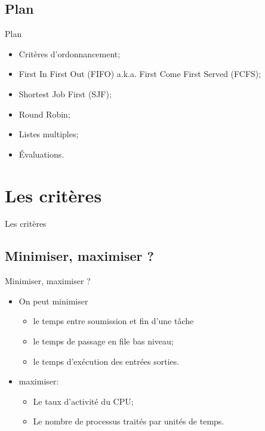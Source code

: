 \begin{frame}{\sectitle}
\def\subsectitle{Plan}
\subsection{\subsectitle}

\begin{block}{\subsectitle}
\begin{itemize}
    \item Critères d'ordonnancement;
    \item First In First Out (FIFO) a.k.a. First Come First Served (FCFS);
    \item Shortest Job First (SJF);
    \item Round Robin;
    \item Listes multiples;
    \item Évaluations.
\end{itemize}
\end{block}

\end{frame}


\def\sectitle{Les critères}
\section{\sectitle}

\begin{frame}{\sectitle}

\def\subsectitle{Minimiser, maximiser ?}
\subsection{\subsectitle}
\begin{block}{\subsectitle}
\begin{itemize}
    \item On peut minimiser
    \begin{itemize}
        \item le temps entre soumission et fin d'une tâche
        \item le temps de passage en file bas niveau;
        \item le temps d'exécution des entrées sorties.
    \end{itemize}
    \item maximiser:
    \begin{itemize}
        \item Le taux d'activité du CPU;
        \item Le nombre de processus traités par unités de temps.
    \end{itemize}
\end{itemize}
\end{block}
\end{frame}

